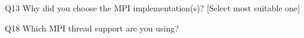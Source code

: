 \begin{description}%
\item{Q13} Why did you choose the MPI implementation(s)? [Select most suitable one]%
\item{Q18} Which MPI thread support are you using?%
\end{description}%
